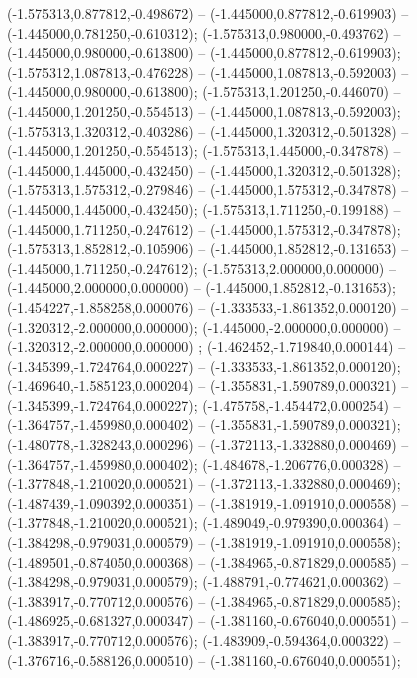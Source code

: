  (-1.575313,0.877812,-0.498672) -- (-1.445000,0.877812,-0.619903) -- (-1.445000,0.781250,-0.610312);
 (-1.575313,0.980000,-0.493762) -- (-1.445000,0.980000,-0.613800) -- (-1.445000,0.877812,-0.619903);
 (-1.575312,1.087813,-0.476228) -- (-1.445000,1.087813,-0.592003) -- (-1.445000,0.980000,-0.613800);
 (-1.575313,1.201250,-0.446070) -- (-1.445000,1.201250,-0.554513) -- (-1.445000,1.087813,-0.592003);
 (-1.575313,1.320312,-0.403286) -- (-1.445000,1.320312,-0.501328) -- (-1.445000,1.201250,-0.554513);
 (-1.575313,1.445000,-0.347878) -- (-1.445000,1.445000,-0.432450) -- (-1.445000,1.320312,-0.501328);
 (-1.575313,1.575312,-0.279846) -- (-1.445000,1.575312,-0.347878) -- (-1.445000,1.445000,-0.432450);
 (-1.575313,1.711250,-0.199188) -- (-1.445000,1.711250,-0.247612) -- (-1.445000,1.575312,-0.347878);
 (-1.575313,1.852812,-0.105906) -- (-1.445000,1.852812,-0.131653) -- (-1.445000,1.711250,-0.247612);
 (-1.575313,2.000000,0.000000) -- (-1.445000,2.000000,0.000000) -- (-1.445000,1.852812,-0.131653);
 (-1.454227,-1.858258,0.000076) -- (-1.333533,-1.861352,0.000120) -- (-1.320312,-2.000000,0.000000);
 (-1.445000,-2.000000,0.000000) -- (-1.320312,-2.000000,0.000000) ;
 (-1.462452,-1.719840,0.000144) -- (-1.345399,-1.724764,0.000227) -- (-1.333533,-1.861352,0.000120);
 (-1.469640,-1.585123,0.000204) -- (-1.355831,-1.590789,0.000321) -- (-1.345399,-1.724764,0.000227);
 (-1.475758,-1.454472,0.000254) -- (-1.364757,-1.459980,0.000402) -- (-1.355831,-1.590789,0.000321);
 (-1.480778,-1.328243,0.000296) -- (-1.372113,-1.332880,0.000469) -- (-1.364757,-1.459980,0.000402);
 (-1.484678,-1.206776,0.000328) -- (-1.377848,-1.210020,0.000521) -- (-1.372113,-1.332880,0.000469);
 (-1.487439,-1.090392,0.000351) -- (-1.381919,-1.091910,0.000558) -- (-1.377848,-1.210020,0.000521);
 (-1.489049,-0.979390,0.000364) -- (-1.384298,-0.979031,0.000579) -- (-1.381919,-1.091910,0.000558);
 (-1.489501,-0.874050,0.000368) -- (-1.384965,-0.871829,0.000585) -- (-1.384298,-0.979031,0.000579);
 (-1.488791,-0.774621,0.000362) -- (-1.383917,-0.770712,0.000576) -- (-1.384965,-0.871829,0.000585);
 (-1.486925,-0.681327,0.000347) -- (-1.381160,-0.676040,0.000551) -- (-1.383917,-0.770712,0.000576);
 (-1.483909,-0.594364,0.000322) -- (-1.376716,-0.588126,0.000510) -- (-1.381160,-0.676040,0.000551);
